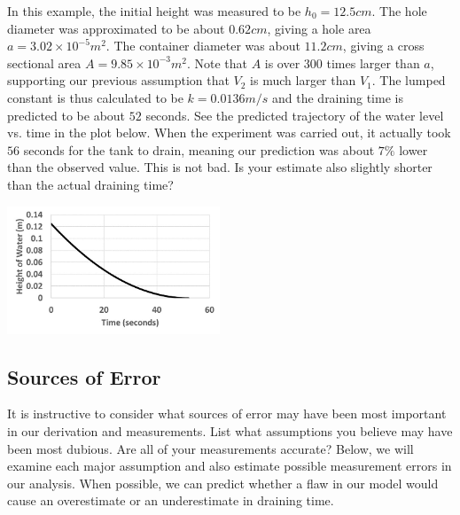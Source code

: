 \documentclass{ximera}
\begin{document}
In this example, the initial height was measured to be $h_0=12.5 cm$.  The hole diameter was approximated to be about $0.62 cm$, giving a hole area $a=3.02\times 10^{-5} m^2$.  The container diameter was about $11.2 cm$, giving a cross sectional area $A=9.85\times 10^{-3} m^2$.  Note that $A$ is over $300$ times larger than $a$, supporting our previous assumption that $V_2$ is much larger than $V_1$.  The lumped constant is thus calculated to be $k=0.0136 m/s$ and the draining time is predicted to be about $52$ seconds.  See the predicted trajectory of the water level vs. time in the plot below.  When the experiment was carried out, it actually took $56$ seconds for the tank to drain, meaning our prediction was about $7\%$ lower than the observed value.  This is not bad.  Is your estimate also slightly shorter than the actual draining time?

\begin{image}
 \includegraphics[height=1.5in]{drainingTank3.jpg}
\end{image}

\subsection*{Sources of Error}

It is instructive to consider what sources of error may have been most important in our derivation and measurements.  List what assumptions you believe may have been most dubious.  Are all of your measurements accurate?  Below, we will examine each major assumption and also estimate possible measurement errors in our analysis.  When possible, we can predict whether a flaw in our model would cause an overestimate or an underestimate in draining time.
\end{document}
